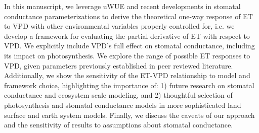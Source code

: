 In this manuscript, we leverage uWUE and recent developments in
stomatal conductance parameterizations \citep{MEDLYN_2011} to derive
the theoretical one-way response of ET to VPD with other environmental
variables properly controlled for, i.e. we develop a framework for
evaluating the partial derivative of ET with respect to VPD. We
explicitly include VPD's full effect on stomatal conductance,
including its impact on photosynthesis. We explore the range of
possible ET responses to VPD, given parameters previously established
in peer reviewed literature. Additionally, we show the sensitivity of
the ET-VPD relationship to model and framework choice, highlighting
the importance of: 1) future research on stomatal conductance and
ecosystem scale modeling, and 2) thoughtful selection of
photosynthesis and stomatal conductance models in more sophisticated
land surface and earth system models. Finally, we discuss the caveats
of our approach and the sensitivity of results to assumptions about
stomatal conductance.
